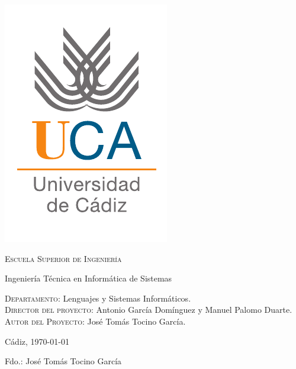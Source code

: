 {
  \thispagestyle{empty}
  \centering
  \includegraphics[width=.2\textwidth]{logo_uca}

  \bigskip
  \bigskip
  \bigskip
  
  \begin{changemargin}{3em}{3em}

    \begin{center}
      {\Huge \textsc{\nohyphens{Escuela Superior de Ingeniería}}}
      
      \bigskip
      \bigskip
      
      {\huge \nohyphens{Ingeniería Técnica en Informática de Sistemas}}
      
      \bigskip
      \bigskip
      \bigskip
      \bigskip
      
      {\LARGE \nohyphens{\nombreProyecto}}

      
      \bigskip
      \bigskip
      \bigskip
      \bigskip
      
    \end{center}
  \end{changemargin}
  \begin{changemargin}{3em}{1em}
  \begin{flushleft}
    \Large

    \textsc{Departamento}: \nohyphens{Lenguajes y Sistemas Informáticos.} \\
    \textsc{Director del proyecto}: \nohyphens{Antonio García Domínguez y Manuel Palomo Duarte.} \\
    \textsc{Autor del Proyecto}: \nohyphens{José Tomás Tocino García}. \\
  \end{flushleft}

  \end{changemargin}  

  \bigskip
  \bigskip
  \bigskip
  
  \begin{flushright}
    \large
    Cádiz, \today

    \bigskip
    \bigskip
    \bigskip
    \bigskip    
    \bigskip
    \bigskip

    Fdo.: José Tomás Tocino García
    
  \end{flushright}

}
